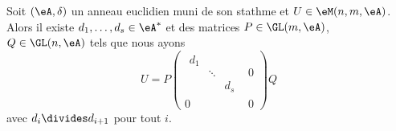 \begin{proposition}   \label{PropPDfCqee}
    Soit \( (\eA,\delta)\) un anneau euclidien muni de son stathme  et \( U\in \eM(n,m,\eA)\). Alors il existe \( d_1,\ldots, d_s\in \eA^*\) et des matrices \( P\in\GL(m,\eA)\), \( Q\in \GL(n,\eA)\) tels que nous ayons
    \begin{equation}
        U=P \begin{pmatrix}
            \begin{matrix}
                d_1    &       &       \\
                    &   \ddots    &       \\
                    &       &   d_s
            \end{matrix}&   0    \\ 
            0    &   0    
        \end{pmatrix}Q
    \end{equation}
    avec \( d_i\divides d_{i+1}\) pour tout \( i\).
\end{proposition}

